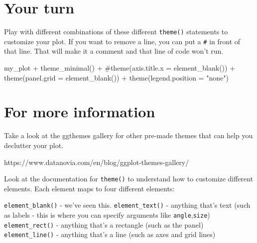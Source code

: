 \documentclass[
  letterpaper,
  DIV=11,
  numbers=noendperiod]{scrreprt}
\newenvironment{Shaded}{\begin{snugshade}}{\end{snugshade}}
\newcommand{\NormalTok}[1]{\textcolor[rgb]{0.00,0.23,0.31}{#1}}
\begin{document}
\section{Your turn}\label{your-turn}

Play with different combinations of these different \texttt{theme()}
statements to customize your plot. If you want to remove a line, you can
put a \texttt{\#} in front of that line. That will make it a comment and
that line of code won't run.

\begin{Shaded}
\begin{Highlighting}[]
\NormalTok{my\_plot +}
\NormalTok{  theme\_minimal() + }
\NormalTok{  \#theme(axis.title.x = element\_blank()) + }
\NormalTok{  theme(panel.grid = element\_blank()) + }
\NormalTok{  theme(legend.position = "none")}
\end{Highlighting}
\end{Shaded}

\section{For more information}\label{for-more-information-1}

Take a look at the ggthemes gallery for other pre-made themes that can
help you declutter your plot.

https://www.datanovia.com/en/blog/ggplot-themes-gallery/

Look at the documentation for \texttt{theme()} to understand how to
customize different elements. Each element maps to four different
elements:

\texttt{element\_blank()} - we've seen this. \texttt{element\_text()} -
anything that's text (such as labels - this is where you can specify
arguments like \texttt{angle},\texttt{size}) \texttt{element\_rect()} -
anything that's a rectangle (such as the panel) \texttt{element\_line()}
- anything that's a line (such as axes and grid lines)
\end{document}
